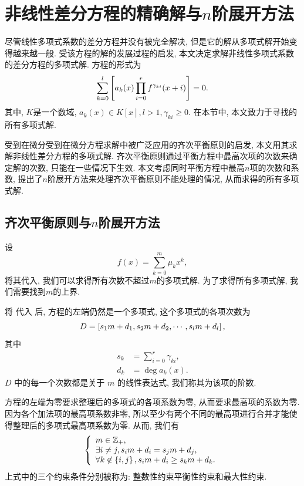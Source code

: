 \chapter{非线性差分方程的精确解与$n$阶展开方法}\label{ch04}
尽管线性多项式系数的差分方程并没有被完全解决, 但是它的解从多项式解开始变得越来越一般. 受该方程的解的发展过程的启发, 本文决定求解非线性多项式系数的差分方程的多项式解. 方程的形式为
\begin{equation}
\sum_{k=0}^l{\left[a_k(x)\prod_{i=0}^r{f^{\gamma_{ki}}(x+i)}\right]}=0.
\label{eq}
\end{equation}
其中, $K$是一个数域, $a_k(x)\in K[x], l>1, \gamma_{ki}\ge 0$. 在本节中, 本文致力于寻找的所有多项式解. 

受到在微分受到在微分方程求解中被广泛应用的齐次平衡原则的启发, 本文用其求解非线性差分方程的多项式解. 齐次平衡原则通过平衡方程中最高次项的次数来确定解的次数, 只能在一些情况下生效. 本文考虑同时平衡方程中最高$n$项的次数和系数, 提出了$n$阶展开方法来处理齐次平衡原则不能处理的情况, 从而求得的所有多项式解. 

\section{齐次平衡原则与$n$阶展开方法}
设
\begin{equation}
f(x)=\sum_{k=0}^m{\mu_kx^k},
\label{fm1}
\end{equation}
将其代入, 我们可以求得所有次数不超过$m$的多项式解. 为了求得所有多项式解, 我们需要找到$m$的上界.

将 代入 后, 方程的左端仍然是一个多项式, 这个多项式的各项次数为
\begin{equation}
D = \left[s_1 m+d_1,s_2 m+d_2,\cdots,s_l m+d_l\right],
\end{equation}
其中
\begin{equation}
\begin{split}
s_k&=\sum_{i=0}^r{\gamma_{ki}}, \\
d_k&=\deg a_k(x).
\end{split}
\label{eq-sd}
\end{equation}
$D$ 中的每一个次数都是关于 $m$ 的线性表达式, 我们称其为该项的阶数.

方程的左端为零要求整理后的多项式的各项系数为零, 从而要求最高项的系数为零. 因为各个加法项的最高项系数非零, 所以至少有两个不同的最高项进行合并才能使得整理后的多项式最高项系数为零. 从而, 我们有 
\begin{equation}
\left\{
\begin{array}{l}
m\in \mathbb Z_+  ,                                     \\
\exists i\neq j, s_i m+d_i=s_j m+d_j    ,               \\
\forall k \not\in \left\{i,j\right\}, s_i m+d_i\ge s_k m+d_k .
\end{array}
\right.
\label{cond}
\end{equation}
上式中的三个约束条件分别被称为: 整数性约束\D 平衡性约束和最大性约束. 

